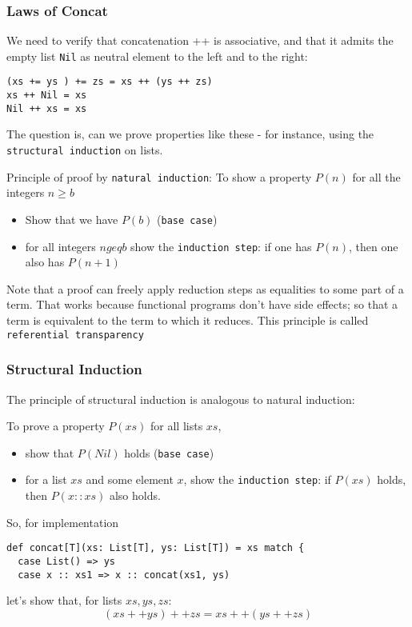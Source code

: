 \documentclass{scrartcl}
\newcommand{\term}[1]{\verb~#1~} %
\begin{document}
\subsubsection{Laws of Concat}
\label{sec:LawsOfConcat}
We need to verify that concatenation ++ is associative, and that it admits the
empty list \lstinline|Nil| as neutral element to the left and to the right: 
\begin{lstlisting}
(xs += ys ) += zs = xs ++ (ys ++ zs)
xs ++ Nil = xs
Nil ++ xs = xs
\end{lstlisting}
The question is, can we prove properties like these - for instance, using the
\term{structural induction} on lists.

Principle of proof by \term{natural induction}:
To show a property $P(n)$ for all the integers $n \geq b$
\begin{itemize}
\item Show that we have $P(b)$ (\term{base case})
\item for all integers $n geq b$ show the \term{induction step}: if one has
  $P(n)$, then one also has $P(n + 1)$
\end{itemize}

Note that a proof can freely apply reduction steps as equalities to some part of
a term. That works because functional programs don't have side effects; so that
a term is equivalent to the term to which it reduces. This principle is called
\term{referential transparency} 

\subsubsection{Structural Induction}
\label{sec:StructuralInduction}
The principle of structural induction is analogous to natural induction:

To prove a property $P(xs)$ for all lists $xs$,
\begin{itemize}
\item show that $P(Nil)$ holds (\term{base case})
\item for a list $xs$ and some element $x$, show the \term{induction step}:
if $P(xs)$ holds, then $P(x :: xs)$ also holds.
\end{itemize}

So, for implementation
\begin{lstlisting}
def concat[T](xs: List[T], ys: List[T]) = xs match {
  case List() => ys
  case x :: xs1 => x :: concat(xs1, ys)
\end{lstlisting}
let's show that, for lists $xs, ys, zs$:
$$ (xs ++ ys) ++ zs = xs ++ (ys ++ zs)$$
\end{document}
